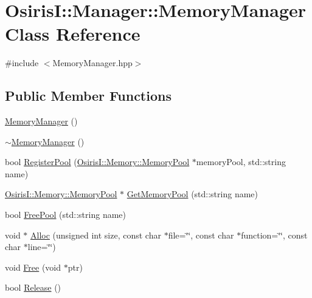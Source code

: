 \hypertarget{class_osiris_i_1_1_manager_1_1_memory_manager}{\section{Osiris\-I\-:\-:Manager\-:\-:Memory\-Manager Class Reference}
\label{class_osiris_i_1_1_manager_1_1_memory_manager}
}


{\ttfamily \#include $<$Memory\-Manager.\-hpp$>$}

\subsection*{Public Member Functions}
\begin{DoxyCompactItemize}
\item 
\hyperlink{class_osiris_i_1_1_manager_1_1_memory_manager_a9cae21e7afc31764b036c4f75866be12}{Memory\-Manager} ()
\item 
\hyperlink{class_osiris_i_1_1_manager_1_1_memory_manager_ac816c274b374350016533c88f08396c4}{$\sim$\-Memory\-Manager} ()
\item 
bool \hyperlink{class_osiris_i_1_1_manager_1_1_memory_manager_a4fb46d34956633e48266ec58b741cbba}{Register\-Pool} (\hyperlink{class_osiris_i_1_1_memory_1_1_memory_pool}{Osiris\-I\-::\-Memory\-::\-Memory\-Pool} $\ast$memory\-Pool, std\-::string name)
\item 
\hyperlink{class_osiris_i_1_1_memory_1_1_memory_pool}{Osiris\-I\-::\-Memory\-::\-Memory\-Pool} $\ast$ \hyperlink{class_osiris_i_1_1_manager_1_1_memory_manager_a6e3aeb5f2e5f896ddcd38e2899d8f3af}{Get\-Memory\-Pool} (std\-::string name)
\item 
bool \hyperlink{class_osiris_i_1_1_manager_1_1_memory_manager_ac1470b7ecd00a3977bdc8f4bece939d4}{Free\-Pool} (std\-::string name)
\item 
void $\ast$ \hyperlink{class_osiris_i_1_1_manager_1_1_memory_manager_a6d7f04ad64012f59a23864165ee34d92}{Alloc} (unsigned int size, const char $\ast$file=\char`\"{}\char`\"{}, const char $\ast$function=\char`\"{}\char`\"{}, const char $\ast$line=\char`\"{}\char`\"{})
\item 
void \hyperlink{class_osiris_i_1_1_manager_1_1_memory_manager_a0f413573cb56f82a8729aa86afc9de5a}{Free} (void $\ast$ptr)
\item 
bool \hyperlink{class_osiris_i_1_1_manager_1_1_memory_manager_afc2a4821e51120679f26669fae08abb4}{Release} ()
\end{DoxyCompactItemize}


